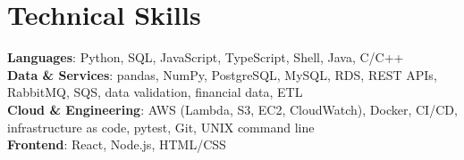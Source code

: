 \documentclass[letterpaper,11pt]{article}
\begin{document}
\section{Technical Skills}
\begin{itemize}[leftmargin=0.15in, label={}]
  \small{\item{
        \textbf{Languages}{: Python, SQL, JavaScript, TypeScript, Shell, Java, C/C++} \\
        \textbf{Data \& Services}{: pandas, NumPy, PostgreSQL, MySQL, RDS, REST APIs, RabbitMQ, SQS, data validation, financial data, ETL} \\
        \textbf{Cloud \& Engineering}{: AWS (Lambda, S3, EC2, CloudWatch), Docker, CI/CD, infrastructure as code, pytest, Git, UNIX command line} \\
        \textbf{Frontend}{: React, Node.js, HTML/CSS}
        }}
\end{itemize}

\end{document}
